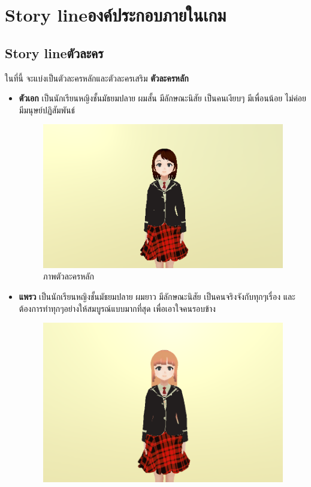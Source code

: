 \section{\ifenglish Story line\else องค์ประกอบภายในเกม\fi }
\subsection{\ifenglish Story line\else ตัวละคร\fi }
ในที่นี้ จะแบ่งเป็นตัวละครหลักและตัวละครเสริม
\subitem \textbf{ตัวละครหลัก}
\begin{itemize}
    \item \textbf{ตัวเอก} เป็นนักเรียนหญิงชั้นมัธยมปลาย ผมสั้น มีลักษณะนิสัย เป็นคนเงียบๆ มีเพื่อนน้อย ไม่ค่อยมีมนุษย์ปฏิสัมพันธ์
    \begin{figure}[h]
        \centering
        \includegraphics[scale=0.5]{Images/main char image.png}
        \caption{ภาพตัวละครหลัก}\label{MainCharacter}
    \end{figure}
    \item \textbf{แพรว} เป็นนักเรียนหญิงชั้นมัธยมปลาย ผมยาว มีลักษณะนิสัย เป็นคนจริงจังกับทุกๆเรื่อง และต้องการทำทุกๆอย่างให้สมบูรณ์แบบมากที่สุด เพื่อเอาใจคนรอบข้าง
    \begin{figure}[h]
        \centering
        \includegraphics[scale=0.5]{Images/Preaw Image.png}

\end{figure}
\end{itemize}
